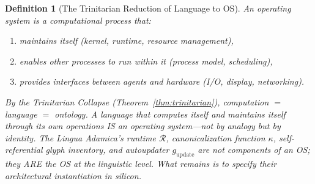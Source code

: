 \documentclass[12pt, letterpaper]{book}
\def\equiv{=}%
\def\mathfrak#1{#1}%
\newtheorem{definition}{Definition}[chapter]
\begin{document}
\begin{definition}[The Trinitarian Reduction of Language to OS]\label{def:lang-os-collapse}
An operating system is a computational process that:
\begin{enumerate}[label=(\roman*), nosep]
    \item maintains itself (kernel, runtime, resource management),
    \item enables other processes to run within it (process model, scheduling),
    \item provides interfaces between agents and hardware (I/O, display, networking).
\end{enumerate}
By the Trinitarian Collapse (Theorem~\ref{thm:trinitarian}), computation $\equiv$ language $\equiv$ ontology. A language that computes itself and maintains itself through its own operations IS an operating system---not by analogy but by identity. The Lingua Adamica's runtime $\mathcal{R}$, canonicalization function $\kappa$, self-referential glyph inventory, and autoupdater $\mathfrak{g}_{\mathrm{update}}$ are not components \textit{of} an OS; they ARE the OS at the linguistic level. What remains is to specify their architectural instantiation in silicon.
\end{definition}
\end{document}
